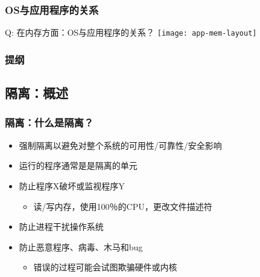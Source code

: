 
\begin{frame}
    
    \frametitle{OS与应用程序的关系}
    Q: 在内存方面：OS与应用程序的关系？
            \centering
    \texttt{[image: app-mem-layout]}
    
\end{frame}

\begin{frame}
    \frametitle{提纲} 
    \tableofcontents 
\end{frame}

\subsection{隔离：概述} 
\begin{frame}
	\frametitle{隔离：\small{什么是隔离？}}
		\begin{itemize}

		\item 强制隔离以避免对整个系统的可用性/可靠性/安全影响
		\item 运行的程序通常是是隔离的单元
		\pause
		
		\item 防止程序X破坏或监视程序Y
			\begin{itemize}
			\item 读/写内存，使用100％的CPU，更改文件描述符
			\end{itemize}
		\item 防止进程干扰操作系统
		\item 防止恶意程序、病毒、木马和bug
			\begin{itemize}
			\item 错误的过程可能会试图欺骗硬件或内核
			\end{itemize}
		\end{itemize}
\end{frame}



